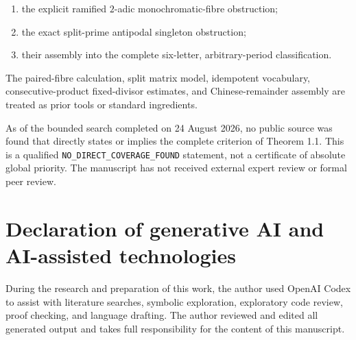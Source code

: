 \documentclass[11pt]{article}
\numberwithin{equation}{section}
\begin{document}
\begin{enumerate}
\item the explicit ramified $2$-adic monochromatic-fibre obstruction;
\item the exact split-prime antipodal singleton obstruction;
\item their assembly into the complete six-letter, arbitrary-period
classification.

\end{enumerate}

The paired-fibre calculation, split matrix model, idempotent vocabulary,
consecutive-product fixed-divisor estimates, and Chinese-remainder assembly
are treated as prior tools or standard ingredients.

As of the bounded search completed on 24 August 2026, no public source was
found that directly states or implies the complete criterion of Theorem 1.1.
This is a qualified \texttt{NO\_DIRECT\_COVERAGE\_FOUND} statement, not a certificate
of absolute global priority. The manuscript has not received external
expert review or formal peer review.

\section*{Declaration of generative AI and AI-assisted technologies}


During the research and preparation of this work, the author used OpenAI
Codex to assist with literature searches, symbolic exploration, exploratory
code review, proof checking, and language drafting. The author reviewed and
edited all generated output and takes full responsibility for the content of
this manuscript.
\end{document}
